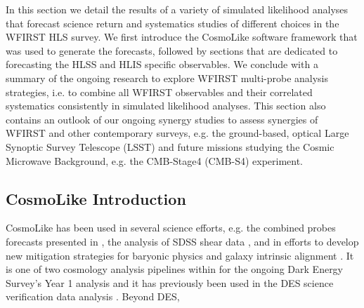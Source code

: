 \newcommand{\nn}{\nonumber}
\newcommand{\vpi}{\mathbf \pi}
\newcommand{\vecd}{\mathbf d}
\newcommand{\matC}{\mathbf C}
\newcommand{\matQ}{\mathbf Q}

\newcommand{\om}{\Omega_\mr m}
\newcommand{\omb}{\Omega_\mr b}
\newcommand{\sig}{\sigma_8}
\newcommand{\ns}{n_s}
\newcommand{\w}{w_0}
\newcommand{\wa}{w_a}

\renewcommand{\d}{{\rm d}}
\newcommand{\pd}{P_{\delta}}
\newcommand{\pe}{P_\mr E}

\newcommand{\vt}{\vartheta}
\newcommand{\vp}{\varphi}
\newcommand{\eps}{\epsilon}
\newcommand{\abs}[1]{| #1 |}
\newcommand{\mr}{\mathrm}

\renewcommand{\d}{{\rm d}}

In this section we detail the results of a variety of simulated likelihood analyses that forecast science return and systematics studies of different choices in the WFIRST HLS survey. We first introduce the CosmoLike software framework that was used to generate the forecasts, followed by sections that are dedicated to forecasting the HLSS and HLIS specific observables. We conclude with a summary of the ongoing research to explore WFIRST multi-probe analysis strategies, i.e. to combine all WFIRST observables and their correlated systematics consistently in simulated likelihood analyses. This section also contains an outlook of our ongoing synergy studies to assess synergies of WFIRST and other contemporary surveys, e.g. the ground-based, optical Large Synoptic Survey Telescope (LSST) and future missions studying the Cosmic Microwave Background, e.g. the CMB-Stage4 (CMB-S4) experiment.

\subsection{CosmoLike Introduction}
\label{sec:cosmolike}
CosmoLike has been used in several science efforts, e.g. the combined probes forecasts presented in \citep{Eifler2014}, the analysis of SDSS shear data \citep{Huff2014}, and in efforts to develop new mitigation strategies for baryonic physics \citep{Eifler2015} and galaxy intrinsic alignment \citep{Krause2016}. It is one of two cosmology analysis pipelines within for the ongoing Dark Energy Survey's Year 1 analysis and it has previously been used in the DES science verification data analysis \citep{The DES Collaboration 2016}. Beyond DES,  

